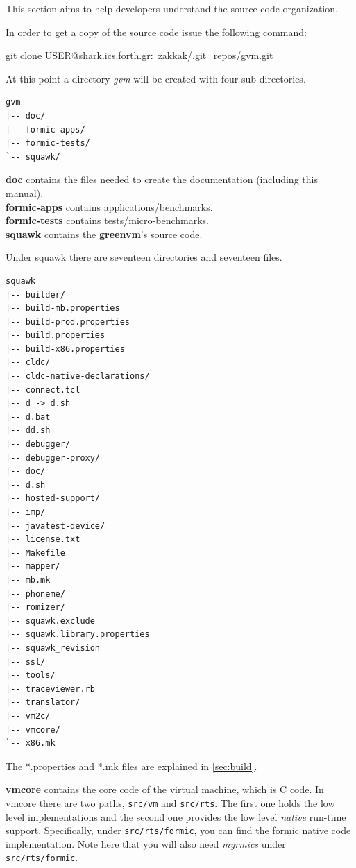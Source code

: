 \documentclass[
a4paper,
12pt,
]{report}
\newcommand{\gvm}{{\fontfamily{fco}\selectfont\textbf{\color{g}green\color{v}vm}}\xspace}
\begin{document}
This section aims to help developers understand the source code
organization.

In order to get a copy of the source code issue the following command:
\begin{bash}
git clone USER@shark.ics.forth.gr:~zakkak/.git_repos/gvm.git
\end{bash}

At this point a directory \textit{gvm} will be created with four
sub-directories.

\begin{verbatim}
gvm
|-- doc/
|-- formic-apps/
|-- formic-tests/
`-- squawk/
\end{verbatim}

\textbf{doc} contains the files needed to create the documentation
(including this manual).\\[1ex]
\textbf{formic-apps} contains applications/benchmarks.\\[1ex]
\textbf{formic-tests} contains tests/micro-benchmarks.\\[1ex]
\textbf{squawk} contains the \gvm's source code.

Under squawk there are seventeen directories and seventeen files.

\begin{verbatim}
squawk
|-- builder/
|-- build-mb.properties
|-- build-prod.properties
|-- build.properties
|-- build-x86.properties
|-- cldc/
|-- cldc-native-declarations/
|-- connect.tcl
|-- d -> d.sh
|-- d.bat
|-- dd.sh
|-- debugger/
|-- debugger-proxy/
|-- doc/
|-- d.sh
|-- hosted-support/
|-- imp/
|-- javatest-device/
|-- license.txt
|-- Makefile
|-- mapper/
|-- mb.mk
|-- phoneme/
|-- romizer/
|-- squawk.exclude
|-- squawk.library.properties
|-- squawk_revision
|-- ssl/
|-- tools/
|-- traceviewer.rb
|-- translator/
|-- vm2c/
|-- vmcore/
`-- x86.mk
\end{verbatim}

The *.properties and *.mk files are explained in \autoref{sec:build}.


\textbf{vmcore} contains the core code of the virtual machine, which
is C code. In vmcore there are two paths, \texttt{src/vm} and
\texttt{src/rts}. The first one holds the low level implementations
and the second one provides the low level \textit{native} run-time
support. Specifically, under \texttt{src/rts/formic}, you can find the
formic native code implementation. Note here that you will also need
\textit{myrmics} under \texttt{src/rts/formic}.
\end{document}
